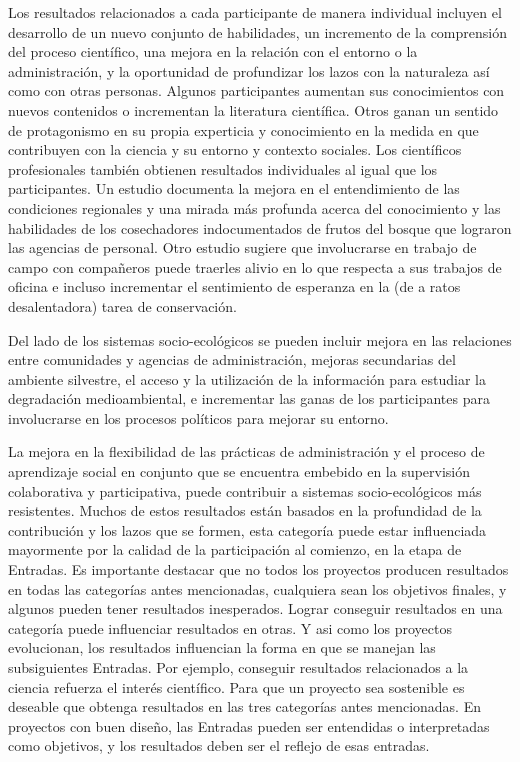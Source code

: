 \begin{itemize}
		Los resultados relacionados a cada participante de manera individual incluyen el desarrollo de un nuevo conjunto de habilidades, un incremento de la comprensión del proceso científico, una mejora en la relación con el entorno o la administración, y la oportunidad de profundizar los lazos con la naturaleza así como con otras personas. Algunos participantes aumentan sus conocimientos con nuevos contenidos o incrementan la literatura científica. Otros ganan un sentido de protagonismo en su propia experticia y conocimiento en la medida en que contribuyen con la ciencia y su entorno y contexto sociales. Los científicos profesionales también obtienen resultados individuales al igual que los participantes. Un estudio documenta la mejora en el entendimiento de las condiciones regionales y una mirada más profunda acerca del conocimiento y las habilidades de los cosechadores indocumentados de frutos del bosque que lograron las agencias de personal. Otro estudio sugiere que involucrarse en trabajo de campo con compañeros puede traerles alivio en lo que respecta a sus trabajos de oficina e incluso incrementar el sentimiento de esperanza en la (de a ratos desalentadora) tarea de conservación. 
		
		Del lado de los sistemas socio-ecológicos se pueden incluir mejora en las relaciones entre comunidades y agencias de administración, mejoras secundarias del ambiente silvestre, el acceso y la utilización de la información para estudiar la degradación medioambiental, e incrementar las ganas de los participantes para involucrarse en los procesos políticos para mejorar su entorno. 
		
		La mejora en la flexibilidad de las prácticas de administración y el proceso de aprendizaje social en conjunto que se encuentra embebido en la supervisión colaborativa y participativa, puede contribuir a sistemas socio-ecológicos más resistentes. Muchos de estos resultados están basados en la profundidad de la contribución y los lazos que se formen, esta categoría puede estar influenciada mayormente por la calidad de la participación al comienzo, en la etapa de Entradas. Es importante destacar que no todos los proyectos producen resultados en todas las categorías antes mencionadas, cualquiera sean los objetivos finales, y algunos pueden tener resultados inesperados. Lograr conseguir resultados en una categoría puede influenciar resultados en otras. Y asi como los proyectos evolucionan, los resultados influencian la forma en que se manejan las subsiguientes Entradas. Por ejemplo, conseguir resultados relacionados a la ciencia refuerza el interés científico. Para que un proyecto sea sostenible es deseable que obtenga resultados en las tres categorías antes mencionadas. En proyectos con buen diseño, las Entradas pueden ser entendidas o interpretadas como objetivos, y los resultados deben ser el reflejo de esas entradas. 
		

\end{itemize}
